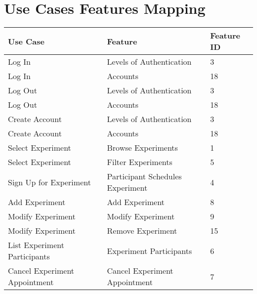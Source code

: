 \section{Use Cases Features Mapping}
\begin{table}[!h]
    \begin{tabular}{|l|l|l|}
        \hline
        Use Case                           & Feature                                              & Feature ID \\ \hline
        Log In                             & Levels of Authentication                             & 3          \\ \hline
        Log In                             & Accounts                                             & 18         \\ \hline
        Log Out                            & Levels of Authentication                             & 3          \\ \hline
        Log Out                            & Accounts                                             & 18         \\ \hline
        Create Account                     & Levels of Authentication                             & 3          \\ \hline
        Create Account                     & Accounts                                             & 18         \\ \hline
        Select Experiment                  & Browse Experiments                                   & 1          \\ \hline
        Select Experiment                  & Filter Experiments                                   & 5          \\ \hline
        Sign Up for Experiment             & Participant Schedules Experiment                     & 4          \\ \hline
        Add Experiment                     & Add Experiment                                       & 8          \\ \hline
        Modify Experiment                  & Modify Experiment                                    & 9          \\ \hline
        Modify Experiment                  & Remove Experiment                                    & 15         \\ \hline
        List Experiment Participants       & Experiment Participants                              & 6          \\ \hline
        Cancel Experiment Appointment      & Cancel Experiment Appointment                        & 7          \\ \hline

\end{tabular}
\end{table}
